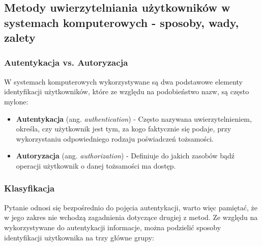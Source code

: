 \subsection{Metody uwierzytelniania użytkowników w systemach komputerowych - sposoby, wady, zalety}

\subsubsection{Autentykacja vs. Autoryzacja}

W systemach komputerowych wykorzystywane są dwa podstawowe elementy identyfikacji użytkowników, które ze względu na podobieństwo nazw, są często mylone:

\begin{itemize}
	\item \textbf{Autentykacja} (ang. \textit{authentication}) - Często nazywana uwierzytelnieniem, określa, czy użytkownik jest tym, za kogo faktycznie się podaje, przy wykorzystaniu odpowiedniego rodzaju
	poświadczeń tożsamości.

	\item \textbf{Autoryzacja} (ang. \textit{authorization}) - Definiuje do jakich zasobów bądź operacji użytkownik o
	danej tożsamości ma dostęp.
\end{itemize}

\subsubsection{Klasyfikacja}

Pytanie odnosi się bezpośrednio do pojęcia autentykacji, warto więc pamiętać, że w jego zakres nie wchodzą zagadnienia dotyczące drugiej z metod. Ze względu na wykorzystywane do autentykacji informacje, można podzielić sposoby identyfikacji użytkownika na trzy główne grupy:


